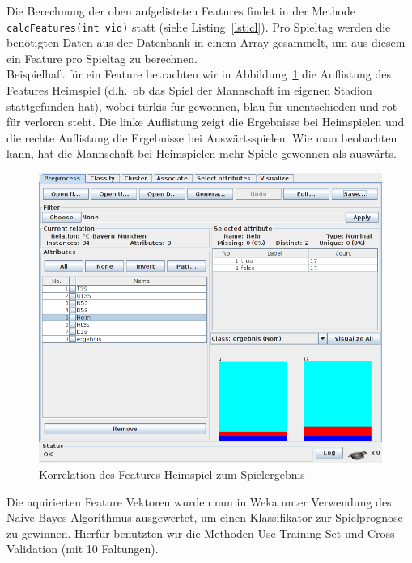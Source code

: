 \documentclass[
10pt,
a4paper
]{scrartcl}
\begin{document}
Die Berechnung der oben aufgelisteten Features findet in der Methode \texttt{calcFeatures(int vid)} statt (siehe Listing~\ref{lst:cl}). Pro Spieltag werden die benötigten Daten aus der Datenbank in einem Array gesammelt, um aus diesem ein Feature pro Spieltag zu berechnen.\\



Beispielhaft für ein Feature betrachten wir in Abbildung~\ref{fig:heim} die Auflistung des Features Heimspiel (d.h.~ob das Spiel der Mannschaft im eigenen Stadion stattgefunden hat), wobei türkis für gewonnen, blau für unentschieden und rot für verloren steht. Die linke Auflistung zeigt die Ergebnisse bei Heimspielen und die rechte Auflistung die Ergebnisse bei Auswärtsspielen. Wie man beobachten kann, hat die Mannschaft bei Heimspielen mehr Spiele gewonnen als auswärts.

\begin{figure}[H]
\centering
  \includegraphics[scale=0.4]{fcb_heim.png}
\caption{Korrelation des Features Heimspiel zum Spielergebnis}
\label{fig:heim}
\end{figure}

Die aquirierten Feature Vektoren wurden nun in Weka unter Verwendung des Naive Bayes Algorithmus ausgewertet, um einen Klassifikator zur Spielprognose zu gewinnen. Hierfür benutzten wir die Methoden Use Training Set und Cross Validation (mit 10 Faltungen).\\
\end{document}
